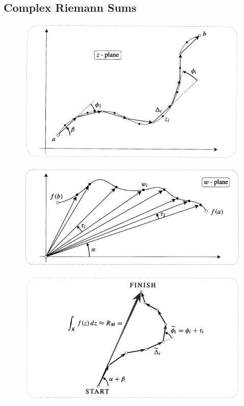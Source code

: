 \documentclass[12pt]{article}
\begin{document}
\subsection{Complex Riemann Sums}
\begin{figure}[h!]
    \centering
    \includegraphics[scale=0.7]{fig_1}
    \label{f1}
\end{figure}
\begin{figure}[h!]
    \centering
    \includegraphics[scale=0.7]{fig_2}
    \label{f2}
\end{figure}
\begin{figure}[h!]
    \centering
    \includegraphics[scale=0.7]{fig_3}
    \label{f3}
\end{figure}
\end{document}
